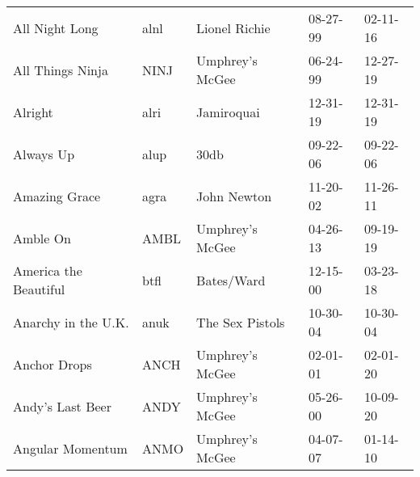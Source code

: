 \begin{longtable}{p{}p{}p{}p{}p{}}
                                                          All Night Long &          alnl &                                            Lionel Richie &              08-27-99 &             02-11-16 \\
                                                        All Things Ninja &          NINJ &                                          Umphrey's McGee &              06-24-99 &             12-27-19 \\
                                                                 Alright &          alri &                                               Jamiroquai &              12-31-19 &             12-31-19 \\
                                                               Always Up &          alup &                                                     30db &              09-22-06 &             09-22-06 \\
                                                           Amazing Grace &          agra &                                              John Newton &              11-20-02 &             11-26-11 \\
                                                                Amble On &          AMBL &                                          Umphrey's McGee &              04-26-13 &             09-19-19 \\
                                                   America the Beautiful &          btfl &                                               Bates/Ward &              12-15-00 &             03-23-18 \\
                                                     Anarchy in the U.K. &          anuk &                                          The Sex Pistols &              10-30-04 &             10-30-04 \\
                                                            Anchor Drops &          ANCH &                                          Umphrey's McGee &              02-01-01 &             02-01-20 \\
                                                        Andy's Last Beer &          ANDY &                                          Umphrey's McGee &              05-26-00 &             10-09-20 \\
                                                        Angular Momentum &          ANMO &                                          Umphrey's McGee &              04-07-07 &             01-14-10 \\

\end{longtable}
